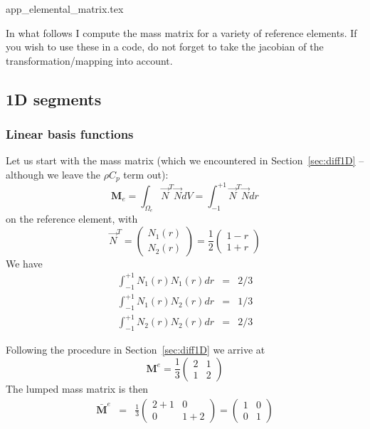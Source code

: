 \begin{flushright} {\tiny {\color{gray} app\_elemental\_matrix.tex}} \end{flushright}

In what follows I compute the mass matrix for a variety of reference elements.
If you wish to use these in a code, do not forget to take the jacobian 
of the transformation/mapping into account. 

\subsection{1D segments}

\subsubsection{Linear basis functions}

Let us start with the mass matrix (which we encountered in 
Section~\ref{sec:diff1D} -- although we leave the $\rho C_p$ term out):
\begin{equation}
{\bm M}_e=\int_{\Omega_e} \vec{N}^T \vec{N} dV
= \int_{-1}^{+1} \vec{N}^T \vec{N} dr
\end{equation}
on the reference element, with 
\[
{\vec N}^T = 
\left(
\begin{array}{c}
N_1(r) \\ N_2(r)
\end{array}
\right)
=
\frac{1}{2}
\left(
\begin{array}{c}
1-r \\ 1+r
\end{array}
\right)
\]
We have 
\begin{eqnarray}
\int_{-1}^{+1} N_1(r) N_1(r) dr &=& 2/3 \\ 
\int_{-1}^{+1} N_1(r) N_2(r) dr &=& 1/3 \\
\int_{-1}^{+1} N_2(r) N_2(r) dr &=& 2/3
\end{eqnarray}

Following the procedure in Section~\ref{sec:diff1D} we arrive at
\[
{\bm M}^e= \frac{1}{3} 
\left(
\begin{array}{cc}
2  & 1 \\
1 & 2
\end{array}
\right)
\]
The lumped mass matrix is then
\begin{eqnarray}
\bar{\bm M}^e 
&=&
\frac{1}{3}
\left(
\begin{array}{cc}
2+1  & 0 \\
0 & 1+2
\end{array}
\right)
=
\left(
\begin{array}{cc}
1  & 0 \\
0 & 1
\end{array}
\right)
\end{eqnarray}

